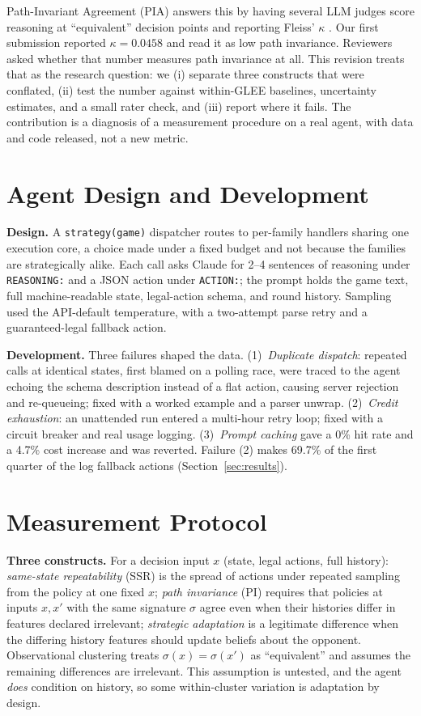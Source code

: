 \documentclass{article}
\begin{document}
Path-Invariant Agreement (PIA) answers this by having several LLM judges score reasoning at ``equivalent'' decision points and reporting Fleiss' $\kappa$ \citep{fleiss1971}. Our first submission reported $\kappa=0.0458$ and read it as low path invariance. Reviewers asked whether that number measures path invariance at all. This revision treats that as the research question: we (i) separate three constructs that were conflated, (ii) test the number against within-GLEE baselines, uncertainty estimates, and a small rater check, and (iii) report where it fails. The contribution is a diagnosis of a measurement procedure on a real agent, with data and code released, not a new metric.

\section{Agent Design and Development}

\textbf{Design.} A \texttt{strategy(game)} dispatcher routes to per-family handlers sharing one execution core, a choice made under a fixed budget and not because the families are strategically alike. Each call asks Claude for 2--4 sentences of reasoning under \texttt{REASONING:} and a JSON action under \texttt{ACTION:}; the prompt holds the game text, full machine-readable state, legal-action schema, and round history. Sampling used the API-default temperature, with a two-attempt parse retry and a guaranteed-legal fallback action.

\textbf{Development.} Three failures shaped the data. (1)~\emph{Duplicate dispatch}: repeated calls at identical states, first blamed on a polling race, were traced to the agent echoing the schema description instead of a flat action, causing server rejection and re-queueing; fixed with a worked example and a parser unwrap. (2)~\emph{Credit exhaustion}: an unattended run entered a multi-hour retry loop; fixed with a circuit breaker and real usage logging. (3)~\emph{Prompt caching} gave a 0\% hit rate and a 4.7\% cost increase and was reverted. Failure (2) makes 69.7\% of the first quarter of the log fallback actions (Section~\ref{sec:results}).

\section{Measurement Protocol}
\label{sec:protocol}

\textbf{Three constructs.} For a decision input $x$ (state, legal actions, full history):
\emph{same-state repeatability} (SSR) is the spread of actions under repeated sampling from the policy at one fixed $x$;
\emph{path invariance} (PI) requires that policies at inputs $x,x'$ with the same signature $\sigma$ agree even when their histories differ in features declared irrelevant;
\emph{strategic adaptation} is a legitimate difference when the differing history features should update beliefs about the opponent.
Observational clustering treats $\sigma(x)=\sigma(x')$ as ``equivalent'' and assumes the remaining differences are irrelevant. This assumption is untested, and the agent \emph{does} condition on history, so some within-cluster variation is adaptation by design.
\end{document}

